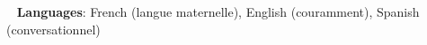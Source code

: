 \documentclass[letterpaper,11pt]{article}
\begin{document}
\sffamily








\vspace{-7pt}
\faGlobe ~ \textbf{Languages}{: French (langue maternelle), English (couramment), Spanish (conversationnel)} \\
\end{document}
